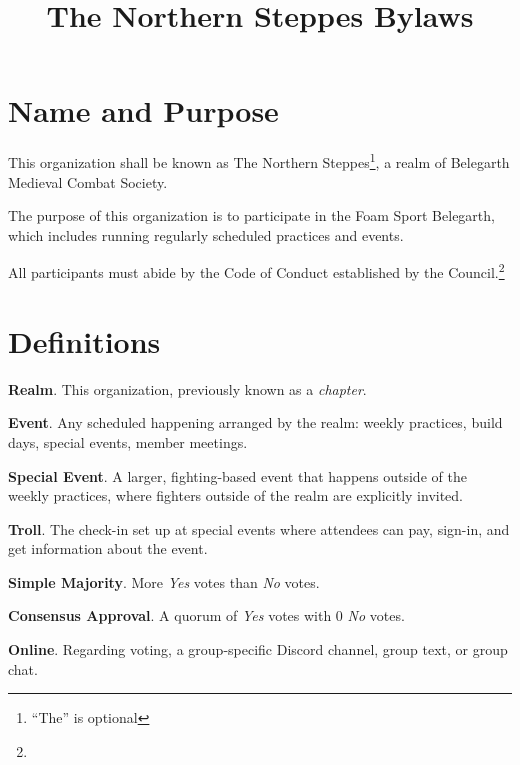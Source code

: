 \documentclass[12pt]{article}
\title{The Northern Steppes Bylaws}
\newcommand{\newpart}[2][]{\colorbox{green!40}{#2}\expandafter\ifx\expandafter\relax\detokenize{#1}\relax\else\textnormal{\footnote{#1}}\fi}
\begin{document}




\section{Name and Purpose}
\begin{level}
    \item This organization shall be known as \newpart[``The'' is optional]{The Northern Steppes}, a realm of Belegarth Medieval Combat Society.
    \item The purpose of this organization is to participate in the Foam Sport Belegarth, which includes running regularly scheduled practices and events.
    \item \newpart{All participants must abide by the Code of Conduct established by the Council.}
\end{level}

\section{Definitions}
\begin{level}
    \item \textbf{Realm}. This organization, previously known as a \emph{chapter}.
    \item \textbf{Event}. Any scheduled happening arranged by the realm: weekly practices, build days, special events, member meetings.
    \item \textbf{Special Event}. A larger, fighting-based event that happens outside of the weekly practices, where fighters outside of the realm are explicitly invited.
    \item \textbf{Troll}. The check-in set up at special events where attendees can pay, sign-in, and get information about the event.
    \item \textbf{Simple Majority}. More \emph{Yes} votes than \emph{No} votes.
    \item \textbf{Consensus Approval}. A quorum of \emph{Yes} votes with 0 \emph{No} votes.
    \item \textbf{Online}. Regarding voting, a group-specific Discord channel, group text, or group chat.
\end{level}
\end{document}
